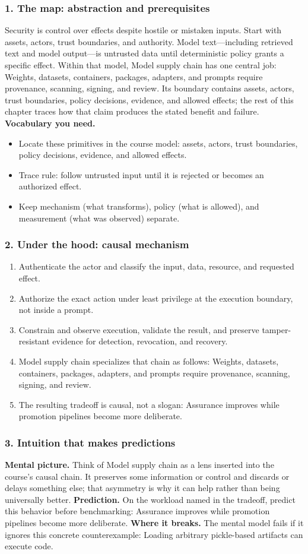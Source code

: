 \subsubsection*{1. The map: abstraction and prerequisites}
Security is control over effects despite hostile or mistaken inputs. Start with assets, actors, trust boundaries, and authority. Model text—including retrieved text and model output—is untrusted data until deterministic policy grants a specific effect.
Within that model, Model supply chain has one central job: Weights, datasets, containers, packages, adapters, and prompts require provenance, scanning, signing, and review. Its boundary contains assets, actors, trust boundaries, policy decisions, evidence, and allowed effects; the rest of this chapter traces how that claim produces the stated benefit and failure.
\textbf{Vocabulary you need.}\begin{itemize}
\item Locate these primitives in the course model: assets, actors, trust boundaries, policy decisions, evidence, and allowed effects.
\item Trace rule: follow untrusted input until it is rejected or becomes an authorized effect.
\item Keep mechanism (what transforms), policy (what is allowed), and measurement (what was observed) separate.
\end{itemize}
\subsubsection*{2. Under the hood: causal mechanism}\begin{enumerate}
\item Authenticate the actor and classify the input, data, resource, and requested effect.
\item Authorize the exact action under least privilege at the execution boundary, not inside a prompt.
\item Constrain and observe execution, validate the result, and preserve tamper-resistant evidence for detection, revocation, and recovery.
\item Model supply chain specializes that chain as follows: Weights, datasets, containers, packages, adapters, and prompts require provenance, scanning, signing, and review.
\item The resulting tradeoff is causal, not a slogan: Assurance improves while promotion pipelines become more deliberate.
\end{enumerate}
\subsubsection*{3. Intuition that makes predictions}
\textbf{Mental picture.} Think of Model supply chain as a lens inserted into the course's causal chain. It preserves some information or control and discards or delays something else; that asymmetry is why it can help rather than being universally better.
\textbf{Prediction.} On the workload named in the tradeoff, predict this behavior before benchmarking: Assurance improves while promotion pipelines become more deliberate.
\textbf{Where it breaks.} The mental model fails if it ignores this concrete counterexample: Loading arbitrary pickle-based artifacts can execute code.
